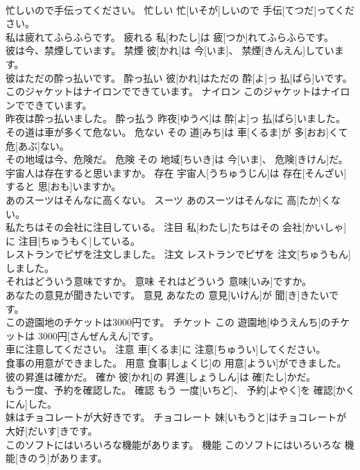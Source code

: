 \documentclass[8pt]{extreport}
\begin{document}
\begin{CJK}{UTF8}{min}
\\	忙しいので手伝ってください。	忙しい	忙[いそが]しいので 手伝[てつだ]ってください。	
\\	私は疲れてふらふらです。	疲れる	私[わたし]は 疲[つか]れてふらふらです。	
\\	彼は今、禁煙しています。	禁煙	彼[かれ]は 今[いま]、 禁煙[きんえん]しています。	
\\	彼はただの酔っ払いです。	酔っ払い	彼[かれ]はただの 酔[よ]っ 払[ぱら]いです。	
\\	このジャケットはナイロンでできています。	ナイロン	このジャケットはナイロンでできています。	
\\	昨夜は酔っ払いました。	酔っ払う	昨夜[ゆうべ]は 酔[よ]っ 払[ぱら]いました。	
\\	その道は車が多くて危ない。	危ない	その 道[みち]は 車[くるま]が 多[おお]くて 危[あぶ]ない。	
\\	その地域は今、危険だ。	危険	その 地域[ちいき]は 今[いま]、 危険[きけん]だ。	
\\	宇宙人は存在すると思いますか。	存在	宇宙人[うちゅうじん]は 存在[そんざい]すると 思[おも]いますか。	
\\	あのスーツはそんなに高くない。	スーツ	あのスーツはそんなに 高[たか]くない。	
\\	私たちはその会社に注目している。	注目	私[わたし]たちはその 会社[かいしゃ]に 注目[ちゅうもく]している。	
\\	レストランでピザを注文しました。	注文	レストランでピザを 注文[ちゅうもん]しました。	
\\	それはどういう意味ですか。	意味	それはどういう 意味[いみ]ですか。	
\\	あなたの意見が聞きたいです。	意見	あなたの 意見[いけん]が 聞[き]きたいです。	
\\	この遊園地のチケットは3000円です。	チケット	この 遊園地[ゆうえんち]のチケットは 3000円[さんぜんえん]です。	
\\	車に注意してください。	注意	車[くるま]に 注意[ちゅうい]してください。	
\\	食事の用意ができました。	用意	食事[しょくじ]の 用意[ようい]ができました。	
\\	彼の昇進は確かだ。	確か	彼[かれ]の 昇進[しょうしん]は 確[たし]かだ。	
\\	もう一度、予約を確認した。	確認	もう 一度[いちど]、 予約[よやく]を 確認[かくにん]した。	
\\	妹はチョコレートが大好きです。	チョコレート	妹[いもうと]はチョコレートが 大好[だいす]きです。	
\\	このソフトにはいろいろな機能があります。	機能	このソフトにはいろいろな 機能[きのう]があります。	

\end{CJK}
\end{document}
